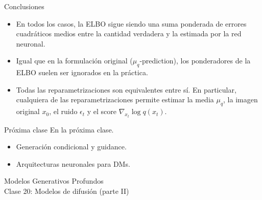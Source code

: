 \documentclass{beamer}
\begin{document}
\begin{frame}{Conclusiones}
    \begin{itemize}
        \item En todos los casos, la ELBO sigue siendo una suma ponderada de errores cuadráticos medios entre la cantidad verdadera y la estimada por la red neuronal.
        \item Igual que en la formulación original ($\mu_q$-prediction), los ponderadores de la ELBO suelen ser ignorados en la práctica.
        \item Todas las reparametrizaciones son equivalentes entre sí. En particular, cualquiera de las reparametrizaciones permite estimar la media $\mu_q$, la imagen original $x_0$, el ruido $\epsilon_t$ y el score $\nabla_{x_t}\log q(x_t)$.
    \end{itemize}
\end{frame}

\begin{frame}{Próxima clase}
    En la próxima clase.
    \begin{itemize}
        \item Generación condicional y guidance.
        \item Arquitecturas neuronales para DMs.
    \end{itemize}
\end{frame}

\begin{frame}
    \centering
    \Large{Modelos Generativos Profundos}\\
    \large{Clase 20: Modelos de difusión (parte II)}
\end{frame}
\end{document}
